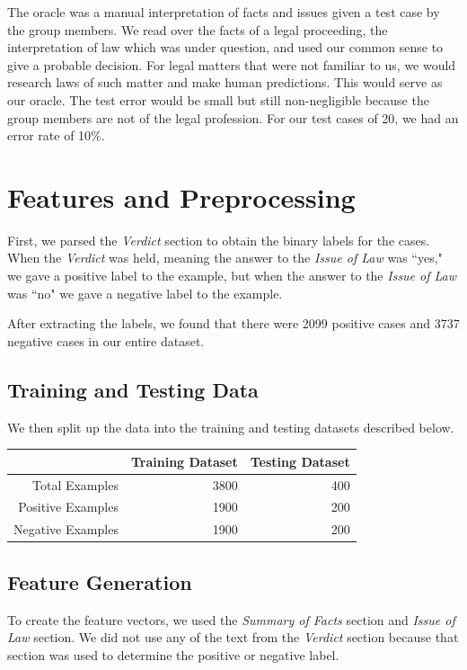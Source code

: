 \documentclass[journal]{IEEEtran}
\begin{document}
The oracle was a manual interpretation of facts and issues given a test case by the group members. We read over the facts of a legal proceeding, the interpretation of law which was under question, and used our common sense to give a probable decision. For legal matters that were not familiar to us, we would research laws of such matter and make human predictions. This would serve as our oracle. The test error would be small but still non-negligible because the group members are not of the legal profession. For our test cases of 20, we had an error rate of 10\%. 

\section{Features and Preprocessing}

First, we parsed the \textit{Verdict} section to obtain the binary labels for the cases. When the \textit{Verdict} was held, meaning the answer to the \textit{Issue of Law} was ``yes," we gave a positive label to the example, but when the answer to the \textit{Issue of Law} was ``no" we gave a negative label to the example. 

After extracting the labels, we found that there were 2099 positive cases and 3737 negative cases in our entire dataset.

\subsection{Training and Testing Data}

We then split up the data into the training and testing datasets described below.

\begin{table}[ht]
\centering
\begin{tabular}{rrr}
  \hline
& Training Dataset &	Testing Dataset\\
  \hline
Total Examples&	3800&	400 \\
Positive Examples &	1900 &	200 \\
Negative Examples &	1900 &	200 \\
   \hline
\end{tabular}
\end{table}

\subsection{Feature Generation}

To create the feature vectors, we used the \textit{Summary of Facts} section and \textit{Issue of Law} section. We did not use any of the text from the \textit{Verdict} section because that section was used to determine the positive or negative label.
\end{document}
